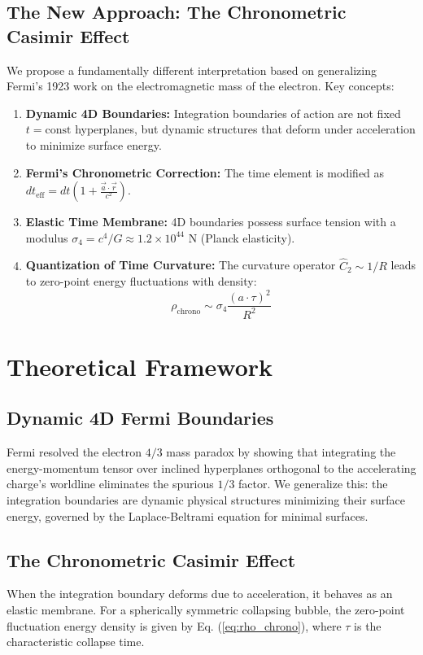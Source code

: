 \documentclass[12pt,a4paper]{article}
\begin{document}
\subsection{The New Approach: The Chronometric Casimir Effect}
We propose a fundamentally different interpretation based on generalizing Fermi's 1923 work on the electromagnetic mass of the electron. Key concepts:
\begin{enumerate}
    \item \textbf{Dynamic 4D Boundaries:} Integration boundaries of action are not fixed $t = \text{const}$ hyperplanes, but dynamic structures that deform under acceleration to minimize surface energy.
    \item \textbf{Fermi's Chronometric Correction:} The time element is modified as $dt_{\text{eff}} = dt\left(1 + \frac{\vec{a}\cdot\vec{r}}{c^2}\right)$.
    \item \textbf{Elastic Time Membrane:} 4D boundaries possess surface tension with a modulus $\sigma_4 = c^4/G \approx 1.2 \times 10^{44}$ N (Planck elasticity).
    \item \textbf{Quantization of Time Curvature:} The curvature operator $\hat{C}_2 \sim 1/R$ leads to zero-point energy fluctuations with density:
    \begin{equation}
    \rho_{\text{chrono}} \sim \sigma_4 \frac{(a \cdot \tau)^2}{R^2}
    \label{eq:rho_chrono}
    \end{equation}
\end{enumerate}

\section{Theoretical Framework}

\subsection{Dynamic 4D Fermi Boundaries}
Fermi resolved the electron $4/3$ mass paradox by showing that integrating the energy-momentum tensor over inclined hyperplanes orthogonal to the accelerating charge's worldline eliminates the spurious $1/3$ factor. We generalize this: the integration boundaries are dynamic physical structures minimizing their surface energy, governed by the Laplace-Beltrami equation for minimal surfaces.

\subsection{The Chronometric Casimir Effect}
When the integration boundary deforms due to acceleration, it behaves as an elastic membrane. For a spherically symmetric collapsing bubble, the zero-point fluctuation energy density is given by Eq. (\ref{eq:rho_chrono}), where $\tau$ is the characteristic collapse time. 
\end{document}
